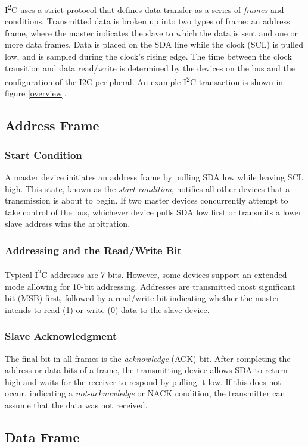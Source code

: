 \documentclass[11pt,fleqn]{book} %
\begin{document}
    I\textsuperscript{2}C uses a strict protocol that defines data transfer as a series of \textit{frames} and conditions.     
    Transmitted data is broken up into two types of frame: an address frame, where the master indicates the slave to which the data is sent and one or more data frames. Data is placed on the SDA line while the clock (SCL) is pulled low, and is sampled during the clock's rising edge. The time between the clock transition and data read/write is determined by the devices on the bus and the configuration of the I2C peripheral. An example I\textsuperscript{2}C transaction is shown in figure \ref{overview}. 
    
    \subsection{Address Frame}
        \subsubsection{Start Condition}
        A master device initiates an address frame by pulling SDA low while leaving SCL high. This state, known as the \textit{start condition}, notifies all other devices that a transmission is about to begin. If two master devices concurrently attempt to take control of the bus, whichever device pulls SDA low first or transmits a lower slave address  wins the arbitration. 
        \subsubsection{Addressing and the Read/Write Bit}
        Typical I\textsuperscript{2}C addresses are 7-bits. However, some devices support an extended mode allowing for 10-bit addressing. Addresses are transmitted most significant bit (MSB) first, followed by a read/write bit indicating whether the master intends to read (1) or write (0) data to the slave device. 
        \subsubsection{Slave Acknowledgment}
        The final bit in all frames is the \textit{acknowledge} (ACK) bit. After completing the address or data bits of a frame, the transmitting device allows SDA to return high and waits for the receiver to respond by pulling it low. If this does not occur, indicating a \textit{not-acknowledge} or NACK condition, the transmitter can assume that the data was not received. 
    \subsection{Data Frame}
\end{document}
